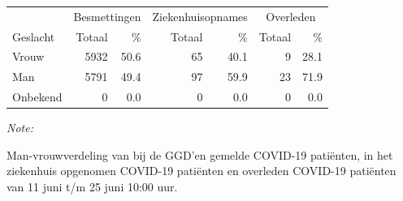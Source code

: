 \documentclass[
  english,
  man,floatsintext]{apa6}
\begin{document}
\begin{table}
\centering\begingroup\fontsize{11}{13}\selectfont

\begin{threeparttable}
\begin{tabular}{lrrrrrr}
\toprule
\multicolumn{1}{c}{ } & \multicolumn{2}{c}{Besmettingen} & \multicolumn{2}{c}{Ziekenhuisopnames} & \multicolumn{2}{c}{Overleden} \\
\cmidrule(l{3pt}r{3pt}){2-3} \cmidrule(l{3pt}r{3pt}){4-5} \cmidrule(l{3pt}r{3pt}){6-7}
Geslacht & Totaal & \% & Totaal & \% & Totaal & \%\\
\midrule
Vrouw & 5932 & 50.6 & 65 & 40.1 & 9 & 28.1\\
Man & 5791 & 49.4 & 97 & 59.9 & 23 & 71.9\\
Onbekend & 0 & 0.0 & 0 & 0.0 & 0 & 0.0\\
\bottomrule
\end{tabular}
\begin{tablenotes}
\item \textit{Note: } 
\item Man-vrouwverdeling van bij de GGD’en gemelde COVID-19 patiënten, in het ziekenhuis opgenomen COVID-19 patiënten en overleden COVID-19 patiënten van 11 juni t/m 25 juni 10:00 uur.
\end{tablenotes}
\end{threeparttable}
\endgroup{}
\end{table}
\newpage
\end{document}
